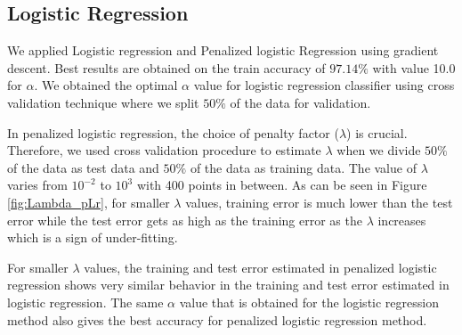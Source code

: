 \subsection{Logistic Regression}

We applied Logistic regression and Penalized logistic Regression using gradient descent. Best results are obtained on the train accuracy of $97.14\%$ with value 10.0 for $\alpha$. We obtained the optimal $\alpha$ value for logistic regression classifier using cross validation technique where we split $50\%$ of the data for validation.

In penalized logistic regression, the choice of penalty factor ($\lambda$) is crucial. Therefore, we used cross validation procedure to estimate $\lambda$ when we divide $50\%$ of the data as test data and $50\%$ of the data as training data. The value of $\lambda$ varies from $10^{-2}$ to $10^3$ with 400 points in between. As can be seen in Figure \ref{fig:Lambda_pLr}, for smaller $\lambda$ values, training error is much lower than the test error while the test error gets as high as the training error  as the $\lambda$ increases which is a sign of under-fitting. 

For smaller $\lambda$ values, the training and test error estimated in penalized logistic regression shows very similar behavior in the training and test error estimated in logistic regression. The same $\alpha$ value that is obtained for the logistic regression method also gives the best accuracy for penalized logistic regression method.

